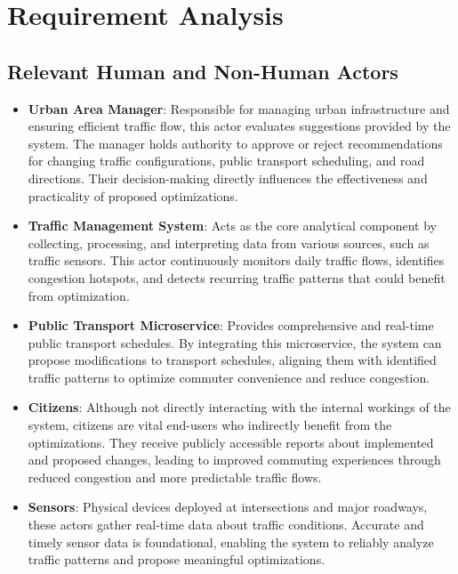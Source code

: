 \documentclass[a4paper,12pt]{article}
\begin{document}
\newpage 

\subtitle{Type 2}

\section{Requirement Analysis}

\subsection{Relevant Human and Non-Human Actors}

\begin{itemize}
    \item \textbf{Urban Area Manager}:
Responsible for managing urban infrastructure and ensuring efficient traffic flow, this actor evaluates suggestions provided by the system. The manager holds authority to approve or reject recommendations for changing traffic configurations, public transport scheduling, and road directions. Their decision-making directly influences the effectiveness and practicality of proposed optimizations.

\item \textbf{Traffic Management System}:
Acts as the core analytical component by collecting, processing, and interpreting data from various sources, such as traffic sensors. This actor continuously monitors daily traffic flows, identifies congestion hotspots, and detects recurring traffic patterns that could benefit from optimization.

\item \textbf{Public Transport Microservice}:
Provides comprehensive and real-time public transport schedules. By integrating this microservice, the system can propose modifications to transport schedules, aligning them with identified traffic patterns to optimize commuter convenience and reduce congestion.

\item \textbf{Citizens}:
Although not directly interacting with the internal workings of the system, citizens are vital end-users who indirectly benefit from the optimizations. They receive publicly accessible reports about implemented and proposed changes, leading to improved commuting experiences through reduced congestion and more predictable traffic flows.

\item \textbf{Sensors}:
Physical devices deployed at intersections and major roadways, these actors gather real-time data about traffic conditions. Accurate and timely sensor data is foundational, enabling the system to reliably analyze traffic patterns and propose meaningful optimizations.
\end{itemize}
\end{document}
